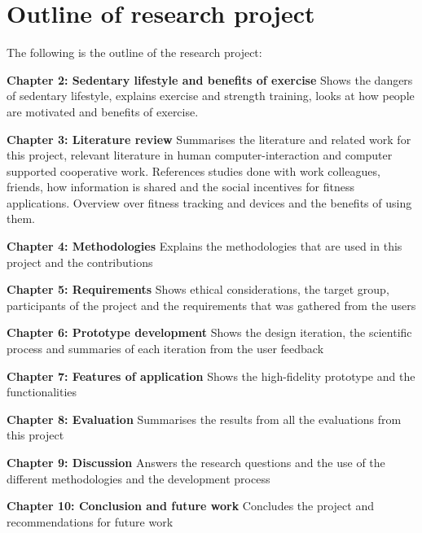 \section{Outline of research project}
The following is the outline of the research project:

\textbf{Chapter 2: Sedentary lifestyle and benefits of exercise} Shows the dangers of sedentary lifestyle, explains exercise and strength training, looks at how people are motivated and benefits of exercise.

\textbf{Chapter 3: Literature review} Summarises the literature and related work for this project, relevant literature in human computer-interaction and computer supported cooperative work. References studies done with work colleagues, friends, how information is shared and the social incentives for fitness applications. Overview over fitness tracking and devices and the benefits of using them.

\textbf{Chapter 4: Methodologies} Explains the methodologies that are used in this project and the contributions

\textbf{Chapter 5: Requirements} Shows ethical considerations, the target group, participants of the project and the requirements that was gathered from the users

\textbf{Chapter 6: Prototype development} Shows the design iteration, the scientific process and summaries of each iteration from the user feedback

\textbf{Chapter 7: Features of application} Shows the high-fidelity prototype and the functionalities

\textbf{Chapter 8: Evaluation} Summarises the results from all the evaluations from this project

\textbf{Chapter 9: Discussion} Answers the research questions and the use of the different methodologies and the development process

\textbf{Chapter 10: Conclusion and future work} Concludes the project and recommendations for future work




